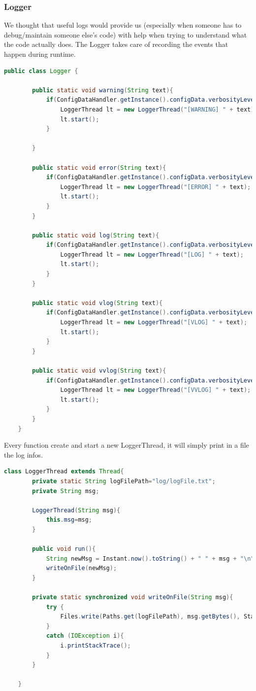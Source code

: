 \subsubsection{Logger}
We thought that useful logs would provide us (especially when someone has to debug/maintain someone else’s code) with help when trying to understand what the code actually does. The Logger takes care of recording the events that happen during runtime.
\begin{lstlisting}[language=Java]
	public class Logger {
		
		public static void warning(String text){
			if(ConfigDataHandler.getInstance().configData.verbosityLevel >= 1){
				LoggerThread lt = new LoggerThread("[WARNING] " + text);
				lt.start();
			}
			
		}
		
		public static void error(String text){
			if(ConfigDataHandler.getInstance().configData.verbosityLevel >= 1){
				LoggerThread lt = new LoggerThread("[ERROR] " + text);
				lt.start();
			}
		}
		
		public static void log(String text){
			if(ConfigDataHandler.getInstance().configData.verbosityLevel >= 1){
				LoggerThread lt = new LoggerThread("[LOG] " + text);
				lt.start();
			}
		}
		
		public static void vlog(String text){
			if(ConfigDataHandler.getInstance().configData.verbosityLevel >= 2){
				LoggerThread lt = new LoggerThread("[VLOG] " + text);
				lt.start();
			}
		}
		
		public static void vvlog(String text){
			if(ConfigDataHandler.getInstance().configData.verbosityLevel >= 3){
				LoggerThread lt = new LoggerThread("[VVLOG] " + text);
				lt.start();
			}
		}
	}
\end{lstlisting}

Every function create and start a new LoggerThread, it will simply print in a file the log infos.

\begin{lstlisting}[language=Java]
	class LoggerThread extends Thread{
		private static String logFilePath="log/logFile.txt";
		private String msg;
		
		LoggerThread(String msg){
			this.msg=msg;
		}
		
		public void run(){
			String newMsg = Instant.now().toString() + " " + msg + "\n";
			writeOnFile(newMsg);
		}
		
		private static synchronized void writeOnFile(String msg){
			try {
				Files.write(Paths.get(logFilePath), msg.getBytes(), StandardOpenOption.APPEND);
			}
			catch (IOException i){
				i.printStackTrace();
			}
		}
		
	}
\end{lstlisting}

